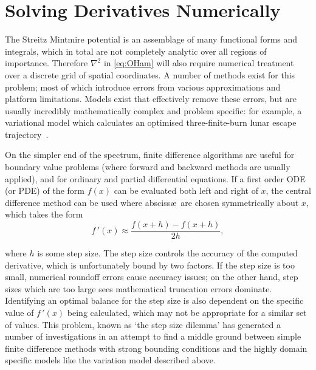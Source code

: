 \section{Solving Derivatives Numerically}\label{sec:numder}
The Streitz Mintmire potential \cite{Streitz1994} is an assemblage of many functional forms and integrals, which in total are not completely analytic over all regions of importance.
Therefore $\nabla^2$ in \cref{eq:OHam} will also require numerical treatment over a discrete grid of spatial coordinates.
A number of methods exist for this problem; most of which introduce errors from various approximations and platform limitations.
Models exist that effectively remove these errors, but are usually incredibly mathematically complex and problem specific: for example, a variational model which calculates an optimised three-finite-burn lunar escape trajectory~\cite{Ocampo2012}.

On the simpler end of the spectrum, finite difference algorithms are useful for boundary value problems (where forward and backward methods are usually applied), and for ordinary and partial differential equations.
If a first order ODE (or PDE) of the form $f(x)$ can be evaluated both left and right of $x$, the central difference method can be used where absciss\ae\ are chosen symmetrically about $x$, which takes the form
\begin{equation}
f\,'(x) \approx \frac{f(x+h)-f(x+h)}{2h},\label{eq:simplecdiff}
\end{equation}

where $h$ is some step size.
The step size controls the accuracy of the computed derivative, which is unfortunately bound by two factors.
If the step size is too small, numerical roundoff errors cause accuracy issues; on the other hand, step sizes which are too large sees mathematical truncation errors dominate.
Identifying an optimal balance for the step size is also dependent on the specific value of $f\,'(x)$ being calculated, which may not be appropriate for a similar set of values.
This problem, known as `the step size dilemma' has generated a number of investigations in an attempt to find a middle ground between simple finite difference methods with strong bounding conditions and the highly domain specific models like the variation model described above.

